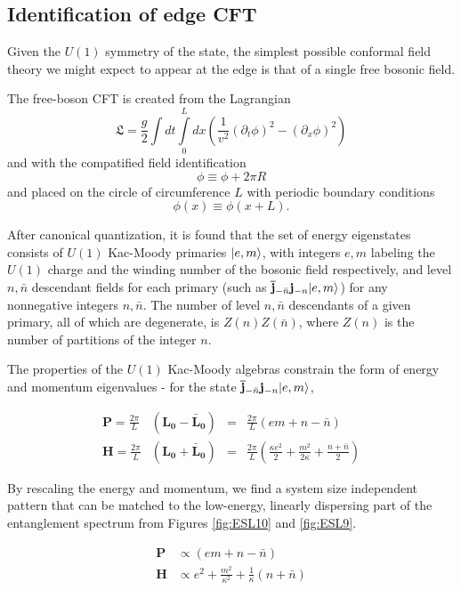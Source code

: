 \newcommand{\uL}{\mathbf{L_0}}
\newcommand{\bL}{\mathbf{\bar{L}_0}}

\subsection{Identification of edge CFT}

Given the $U(1)$ symmetry of the state, the simplest possible conformal field theory we might expect to appear at the edge is that of a single free bosonic field. 

The free-boson CFT is created from the Lagrangian 
$$ \mathfrak{L} = \frac{g}{2}\int dt \int\limits_0^L dx ( \frac{1}{v^2}(\partial_t \phi)^2 - (\partial_x \phi)^2)$$
and with the compatified field identification
$$ \phi \equiv \phi + 2\pi R$$
and placed on the circle of circumference $L$ with periodic boundary conditions
$$ \phi(x) \equiv \phi(x+L).$$

After canonical quantization, it is found that the set of energy eigenstates consists of $U(1)$ Kac-Moody primaries $\vert e, m \rangle$, with integers $e, m$ labeling the $U(1)$ charge and the winding number of the bosonic field respectively, and level $n, \bar{n}$ descendant fields for each primary (such as  $\mathbf{\bar{j}}_{-\bar{n}} \mathbf{j}_{-n} \vert e, m \rangle$) for any nonnegative integers $n, \bar{n}$. The number of level $n, \bar{n}$ descendants of a given primary, all of which are degenerate, is $Z(n) Z(\bar{n})$, where $Z(n)$ is the number of partitions of the integer $n$.

The properties of the $U(1)$ Kac-Moody algebras constrain the form of energy and momentum eigenvalues - for the state $\mathbf{\bar{j}}_{-\bar{n}} \mathbf{j}_{-n} \vert e, m \rangle$, 

\begin{align*}
	\mathbf{P} =\frac{2\pi}{L}&(\uL-\bL) 
	&=& \frac{2\pi}{L}(em + n - \bar{n}) \\
	\mathbf{H} = \frac{2\pi}{L}&(\uL+\bL) 
	&=& \frac{2\pi}{L}(\frac{\kappa e^2}{2} + \frac{m^2}{2 \kappa} + \frac{n + \bar{n}}{2}) %
\end{align*}

By rescaling the energy and momentum, we find a system size independent pattern that can be matched to the low-energy, linearly dispersing part of the entanglement spectrum from Figures \ref{fig:ESL10} and \ref{fig:ESL9}. 

\begin{align*}
\mathbf{P} &\propto (em + n - \bar{n}) \\
\mathbf{H} &\propto e^2 + \frac{m^2}{\kappa^2} + \frac{1}{\kappa}(n + \bar{n})
\end{align*}

